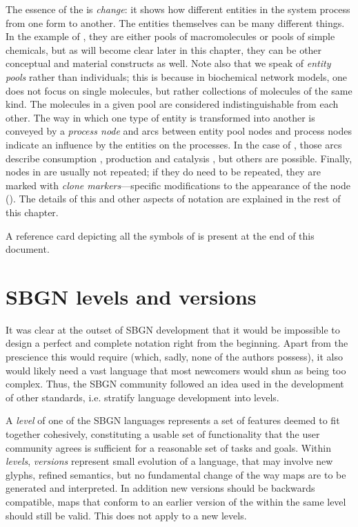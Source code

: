 The essence of the \PDs is \emph{change}: it shows how different entities in the system process from one form to another.  The entities themselves can be many different things.  In the example of , they are either pools of macromolecules or pools of simple chemicals, but as will become clear later in this chapter, they can be other conceptual and material constructs as well.  Note also that we speak of \emph{entity pools} rather than individuals; this is because in biochemical network models, one does not focus on single molecules, but rather collections of molecules of the same kind.  The molecules in a given pool are considered indistinguishable from each other.  The way in which one type of entity is transformed into another is conveyed by a \emph{process node} and arcs between entity pool nodes and process nodes indicate an influence by the entities on the processes.  In the case of , those arcs describe consumption , production  and catalysis 
, but others are possible.  Finally, nodes in \PDs are usually not repeated; if they do need to be repeated, they are marked with \emph{clone markers}---specific modifications to the appearance of the node (). The details of this and other aspects of \PD notation are explained in the rest of this chapter.

A reference card depicting all the symbols of \SBGNPDLone is present at the end of this document.

\section{SBGN levels and versions}
\label{sec:sbgn-levels}

It was clear at the outset of SBGN development that it would be impossible to design a perfect and complete notation right from the beginning.  Apart from the prescience this would require (which, sadly, none of the authors possess), it also would likely need a vast language that most newcomers would shun as being too complex.  Thus, the SBGN community followed an idea used in the development of other standards, i.e. stratify language development into levels.

A \emph{level} of one of the SBGN languages represents a set of features deemed to fit together cohesively, constituting a usable set of functionality that the user community agrees is sufficient for a reasonable set of tasks and goals.  Within \emph{levels}, \emph{versions} represent small evolution of a language, that may involve new glyphs, refined semantics, but no fundamental change of the way maps are to be generated and interpreted. In addition new versions should be backwards compatible, \ie \PD maps that conform to an earlier version of the \PDl within the same level should still be valid.  This does not apply to a new levels. 

